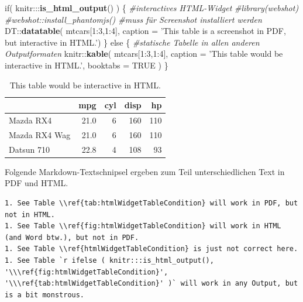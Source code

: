 \documentclass[]{book}
\makeatletter
\newenvironment{Shaded}{\begin{snugshade}}{\end{snugshade}}
\newcommand{\KeywordTok}[1]{\textcolor[rgb]{0.13,0.29,0.53}{\textbf{{#1}}}}
\newcommand{\DataTypeTok}[1]{\textcolor[rgb]{0.13,0.29,0.53}{{#1}}}
\newcommand{\DecValTok}[1]{\textcolor[rgb]{0.00,0.00,0.81}{{#1}}}
\newcommand{\StringTok}[1]{\textcolor[rgb]{0.31,0.60,0.02}{{#1}}}
\newcommand{\CommentTok}[1]{\textcolor[rgb]{0.56,0.35,0.01}{\textit{{#1}}}}
\newcommand{\OtherTok}[1]{\textcolor[rgb]{0.56,0.35,0.01}{{#1}}}
\newcommand{\NormalTok}[1]{{#1}}
\newenvironment{kframe}{%
\medskip{}
\setlength{\fboxsep}{.8em}
 \def\at@end@of@kframe{}%
 \ifinner\ifhmode%
  \def\at@end@of@kframe{\end{minipage}}%
  \begin{minipage}{\columnwidth}%
 \fi\fi%
 \def\FrameCommand##1{\hskip\@totalleftmargin \hskip-\fboxsep
 \colorbox{shadecolor}{##1}\hskip-\fboxsep
     \hskip-\linewidth \hskip-\@totalleftmargin \hskip\columnwidth}%
 \MakeFramed {\advance\hsize-\width
   \@totalleftmargin\z@ \linewidth\hsize
   \@setminipage}}%
 {\par\unskip\endMakeFramed%
 \at@end@of@kframe}
\renewenvironment{Shaded}{\begin{kframe}}{\end{kframe}}
\theoremstyle{definition}
\theoremstyle{definition}
\theoremstyle{remark}
\makeatother
\begin{document}
\begin{Shaded}
\begin{Highlighting}[]
\NormalTok{if( knitr:::}\KeywordTok{is_html_output}\NormalTok{() ) \{}
  \CommentTok{#interactives HTML-Widget}
  \CommentTok{#library(webshot)}
  \CommentTok{#webshot::install_phantomjs()  #muss für Screenshot installiert werden}
  \NormalTok{DT::}\KeywordTok{datatable}\NormalTok{(}
    \NormalTok{mtcars[}\DecValTok{1}\NormalTok{:}\DecValTok{3}\NormalTok{,}\DecValTok{1}\NormalTok{:}\DecValTok{4}\NormalTok{], }\DataTypeTok{caption =} \StringTok{'This table is a screenshot in PDF, but interactive in HTML.'}\NormalTok{)}
\NormalTok{\} else \{}
  \CommentTok{#statische Tabelle in allen anderen Outputformaten  }
  \NormalTok{knitr::}\KeywordTok{kable}\NormalTok{(}
    \NormalTok{mtcars[}\DecValTok{1}\NormalTok{:}\DecValTok{3}\NormalTok{,}\DecValTok{1}\NormalTok{:}\DecValTok{4}\NormalTok{], }\DataTypeTok{caption =} \StringTok{'This table would be interactive in HTML.'}\NormalTok{,}
    \DataTypeTok{booktabs =} \OtherTok{TRUE}
    \NormalTok{)}
\NormalTok{\}}
\end{Highlighting}
\end{Shaded}

\begin{table}

\caption{\label{tab:htmlWidgetTableCondition}This table would be interactive in HTML.}
\centering
\begin{tabular}[t]{lrrrr}
\toprule
  & mpg & cyl & disp & hp\\
\midrule
Mazda RX4 & 21.0 & 6 & 160 & 110\\
Mazda RX4 Wag & 21.0 & 6 & 160 & 110\\
Datsun 710 & 22.8 & 4 & 108 & 93\\
\bottomrule
\end{tabular}
\end{table}

Folgende Markdown-Textschnipsel ergeben zum Teil unterschiedlichen Text
in PDF und HTML.

\begin{verbatim}
1. See Table \\ref{tab:htmlWidgetTableCondition} will work in PDF, but not in HTML.
1. See Table \\ref{fig:htmlWidgetTableCondition} will work in HTML (and Word btw.), but not in PDF.
1. See Table \\ref{htmlWidgetTableCondition} is just not correct here.
1. See Table `r ifelse ( knitr:::is_html_output(), '\\\ref{fig:htmlWidgetTableCondition}', '\\\ref{tab:htmlWidgetTableCondition}' )` will work in any Output, but is a bit monstrous.
\end{verbatim}
\end{document}
